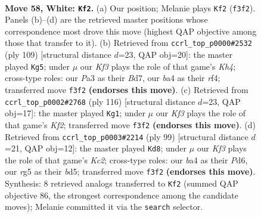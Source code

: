 \documentclass[11pt]{article}
\begin{document}
\clearpage

\begin{figure}[p]\centering
\begin{subfigure}{0.46\textwidth}\centering
\resizebox{\linewidth}{!}{%
\newchessgame
\chessboard[
  setfen={8/7k/1R6/pp4r1/b1p5/P1P2K2/1B6/8 w - - 22 58},
  showmover=false,
  pgfstyle=straightmove, color=movearrow, markmove={f3-f2}
]}
\caption{}
\end{subfigure}\hfill
\begin{subfigure}{0.46\textwidth}\centering
\resizebox{\linewidth}{!}{%
\newchessgame
\chessboard[
  setfen={8/3b4/3r4/1p1P3k/5R2/1B3P1p/P6K/8 b - - 3 55},
  showmover=false,
  pgfstyle=straightmove, color=movearrow, markmove={h5-g5}
]}
\caption{}
\end{subfigure}
\\[4pt]
\begin{subfigure}{0.46\textwidth}\centering
\resizebox{\linewidth}{!}{%
\newchessgame
\chessboard[
  setfen={3k4/7R/3p4/3Pp2p/4P1bP/3r4/5KB1/8 w - - 15 59},
  showmover=false,
  pgfstyle=straightmove, color=movearrow, markmove={f2-g1}
]}
\caption{}
\end{subfigure}\hfill
\begin{subfigure}{0.46\textwidth}\centering
\resizebox{\linewidth}{!}{%
\newchessgame
\chessboard[
  setfen={8/2k5/3p1p2/p2B4/4PPK1/1P6/P2b4/8 b - - 15 50},
  showmover=false,
  pgfstyle=straightmove, color=movearrow, markmove={c7-d8}
]}
\caption{}
\end{subfigure}
\caption{\textbf{Move 58, White: \texttt{Kf2}.} (a) Our position; Melanie plays \texttt{Kf2} (\texttt{f3f2}). Panels (b)--(d) are the retrieved master positions whose correspondence most drove this move (highest QAP objective among those that transfer to it). (b) Retrieved from \texttt{ccrl\_top\_p0000\#2532} (ply 109) [structural distance $d$=23, QAP obj=20]: the master played \texttt{Kg5}; under $\mu$ our \emph{Kf3} plays the role of that game's \emph{Kh4}; cross-type roles: our \emph{P}a3 as their \emph{B}d7, our \emph{b}a4 as their \emph{r}f4; transferred move \texttt{f3f2} \textbf{(endorses this move)}. (c) Retrieved from \texttt{ccrl\_top\_p0002\#2768} (ply 116) [structural distance $d$=23, QAP obj=17]: the master played \texttt{Kg1}; under $\mu$ our \emph{Kf3} plays the role of that game's \emph{Kf2}; transferred move \texttt{f3f2} \textbf{(endorses this move)}. (d) Retrieved from \texttt{ccrl\_top\_p0003\#2214} (ply 99) [structural distance $d$=21, QAP obj=12]: the master played \texttt{Kd8}; under $\mu$ our \emph{Kf3} plays the role of that game's \emph{Kc2}; cross-type roles: our \emph{b}a4 as their \emph{P}d6, our \emph{r}g5 as their \emph{b}d5; transferred move \texttt{f3f2} \textbf{(endorses this move)}. Synthesis: 8 retrieved analogs transferred to \texttt{Kf2} (summed QAP objective 86, the strongest correspondence among the candidate moves); Melanie committed it via the \texttt{search} selector.}
\label{fig:thought-m114}
\end{figure}
\end{document}
